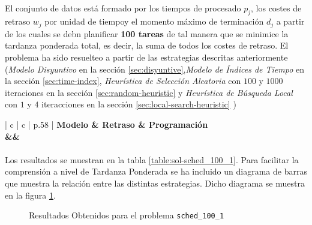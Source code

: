 \documentclass[spanish]{article}
\begin{document}
			\paragraph{}
			El conjunto de datos está formado por los tiempos de procesado $p_j$, los costes de retraso $w_j$ por unidad de tiempoy el momento máximo de terminación $d_j$ a partir de los cuales se debn planificar \textbf{100 tareas} de tal manera que se minimice la tardanza ponderada total, es decir, la suma de todos los costes de retraso. El problema ha sido resuelteo a partir de las estrategias descritas anteriormente (\emph{Modelo Disyuntivo} en la sección \ref{sec:disyuntive},\emph{Modelo de Índices de Tiempo} en la sección \ref{sec:time-index}, \emph{Heurística de Selección Aleatoria} con $100$ y $1000$ iteraciones en la sección \ref{sec:random-heuristic} y \emph{Heurística de Búsqueda Local} con $1$ y $4$ iteracciones en la sección \ref{sec:local-search-heuristic} )


			\begin{table}
				\centering
				\begin{tabu}{ | c | c | p{.58\linewidth} |}
					\hline
					\bfseries Modelo & \bfseries Retraso & \bfseries Programación
					{\\\hline\model&\delay&\schedule}
					\\\hline
				\end{tabu}
				\caption{Resultados Obtenidos para el problema \texttt{sched\_100\_1}}
				\label{table:sol-sched_100_1}
			\end{table}

			\paragraph{}
			Los resultados se muestran en la tabla \ref{table:sol-sched_100_1}. Para facilitar la comprensión a nivel de Tardanza Ponderada se ha incluido un diagrama de barras que muestra la relación entre las distintas estrategias. Dicho diagrama se muestra en la figura \ref{plot:sol-sched_100_1}.


			\begin{figure}
				\begin{center}
				\end{center}
				\caption{Resultados Obtenidos para el problema \texttt{sched\_100\_1}}
				\label{plot:sol-sched_100_1}
			\end{figure}
\end{document}
